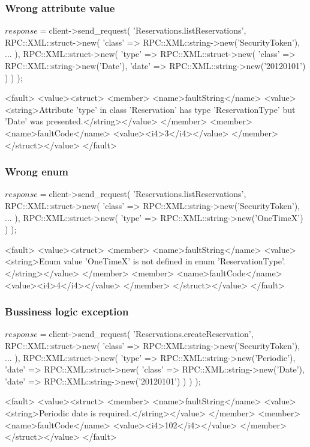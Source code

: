 \documentclass[a4paper]{report}
\begin{document}
\subsubsection{Wrong attribute value}
\begin{PerlCmd}
$response = $client->send_request(
    'Reservations.listReservations',
    RPC::XML::struct->new(
        'class' => RPC::XML::string->new('SecurityToken'),
        ...
    ),
    RPC::XML::struct->new(
        'type' => RPC::XML::struct->new(
            'class' => RPC::XML::string->new('Date'),
            'date' => RPC::XML::string->new('20120101')
        )
    )
);
\end{PerlCmd}
\begin{PerlResponse}
<fault>
  <value><struct>
    <member>
      <name>faultString</name>
      <value><string>Attribute 'type' in class 'Reservation' has type
          'ReservationType' but 'Date' was presented.</string></value>
    </member>
    <member>
      <name>faultCode</name>
      <value><i4>3</i4></value>
    </member>
  </struct></value>
</fault>
\end{PerlResponse}

\subsubsection{Wrong enum}
\begin{PerlCmd}
$response = $client->send_request(
    'Reservations.listReservations',
    RPC::XML::struct->new(
        'class' => RPC::XML::string->new('SecurityToken'),
        ...
    ),
    RPC::XML::struct->new(
        'type' => RPC::XML::string->new('OneTimeX')
    )
);
\end{PerlCmd}
\begin{PerlResponse}
<fault>
  <value><struct>
    <member>
      <name>faultString</name>
      <value><string>Enum value 'OneTimeX' is not defined in enum
          'ReservationType'.</string></value>
    </member>
    <member>
      <name>faultCode</name>
      <value><i4>4</i4></value>
    </member>
  </struct></value>
</fault>
\end{PerlResponse}

\subsubsection{Bussiness logic exception}
\begin{PerlCmd}
$response = $client->send_request(
    'Reservations.createReservation',
    RPC::XML::struct->new(
        'class' => RPC::XML::string->new('SecurityToken'),
        ...
    ),
    RPC::XML::struct->new(
        'type' => RPC::XML::string->new('Periodic'),
        'date' => RPC::XML::struct->new(
            'class' => RPC::XML::string->new('Date'),
            'date' => RPC::XML::string->new('20120101')
        )
    )
);
\end{PerlCmd}
\begin{PerlResponse}
<fault>
  <value><struct>
    <member>
      <name>faultString</name>
      <value><string>Periodic date is required.</string></value>
    </member>
    <member>
      <name>faultCode</name>
      <value><i4>102</i4></value>
    </member>
  </struct></value>
</fault>
\end{PerlResponse}
\end{document}

